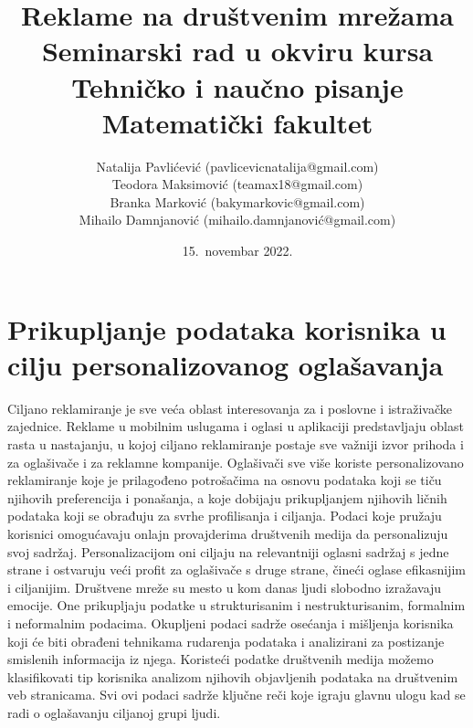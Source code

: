 \documentclass[a4paper]{article}
\title{Reklame na društvenim mrežama\\ \small{Seminarski rad u okviru kursa\\Tehničko i naučno pisanje\\ Matematički fakultet}}
\author{Natalija Pavlićević (pavlicevicnatalija@gmail.com)\\ Teodora Maksimović (teamax18@gmail.com)\\ Branka Marković (bakymarkovic@gmail.com)\\ Mihailo Damnjanović (mihailo.damnjanović@gmail.com)}
\date{15.~novembar 2022.}
\begin{document}
	
	\section{Prikupljanje podataka korisnika u cilju personalizovanog oglašavanja}
	\label{sec:podaci}
	Ciljano reklamiranje je sve veća oblast interesovanja za i poslovne i istraživačke zajednice. Reklame u mobilnim uslugama i oglasi u aplikaciji predstavljaju oblast rasta u nastajanju, u kojoj ciljano reklamiranje postaje sve važniji izvor prihoda i za oglašivače i za reklamne kompanije. Oglašivači sve više koriste personalizovano reklamiranje koje je prilagođeno potrošačima na osnovu podataka koji se tiču njihovih preferencija i ponašanja, a koje dobijaju prikupljanjem njihovih ličnih podataka koji se obrađuju za svrhe profilisanja i ciljanja. Podaci koje pružaju korisnici omogućavaju onlajn provajderima društvenih medija da personalizuju svoj sadržaj. Personalizacijom oni ciljaju na relevantniji oglasni sadržaj s jedne strane i ostvaruju veći profit za oglašivače s druge strane, čineći oglase efikasnijim i ciljanijim.
	Društvene mreže su mesto u kom danas ljudi slobodno izražavaju emocije. One prikupljaju podatke u strukturisanim i nestrukturisanim, formalnim i neformalnim podacima. Okupljeni podaci sadrže osećanja i mišljenja korisnika koji će biti obrađeni tehnikama rudarenja podataka i analizirani za postizanje smislenih informacija iz njega. Koristeći podatke društvenih medija možemo klasifikovati tip korisnika analizom njihovih objavljenih podataka na društvenim veb stranicama. Svi ovi podaci sadrže ključne reči koje igraju glavnu ulogu kad se radi o oglašavanju ciljanoj grupi ljudi.
	
\end{document}
